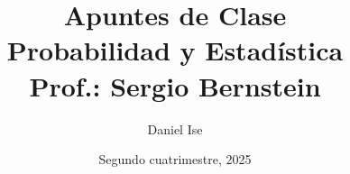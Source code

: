\documentclass[10pt]{article}
\title{Apuntes de Clase\\Probabilidad y Estadística\\Prof.: Sergio Bernstein}
\author{Daniel Ise}
\date{Segundo cuatrimestre, 2025}
\begin{document}
\maketitle
\pagebreak

\tableofcontents
\pagebreak



\end{document}
